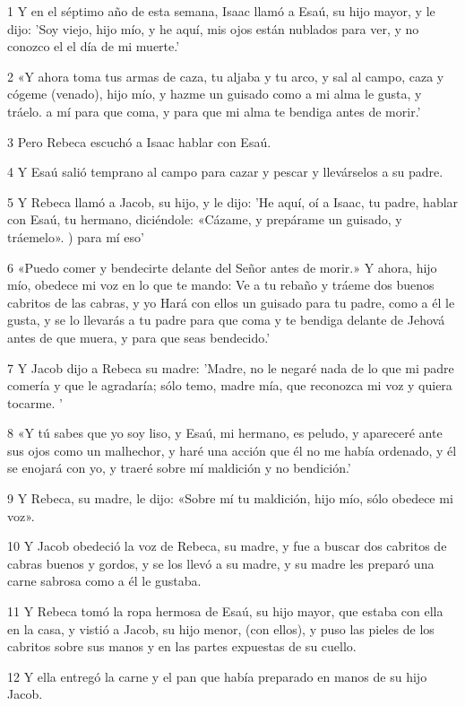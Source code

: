 \par 1 Y en el séptimo año de esta semana, Isaac llamó a Esaú, su hijo mayor, y le dijo: 'Soy viejo, hijo mío, y he aquí, mis ojos están nublados para ver, y no conozco el el día de mi muerte.'
\par 2 «Y ahora toma tus armas de caza, tu aljaba y tu arco, y sal al campo, caza y cógeme (venado), hijo mío, y hazme un guisado como a mi alma le gusta, y tráelo. a mí para que coma, y ​​para que mi alma te bendiga antes de morir.'
\par 3 Pero Rebeca escuchó a Isaac hablar con Esaú.
\par 4 Y Esaú salió temprano al campo para cazar y pescar y llevárselos a su padre.
\par 5 Y Rebeca llamó a Jacob, su hijo, y le dijo: 'He aquí, oí a Isaac, tu padre, hablar con Esaú, tu hermano, diciéndole: «Cázame, y prepárame un guisado, y tráemelo». ) para mí eso'
\par 6 «Puedo comer y bendecirte delante del Señor antes de morir.» Y ahora, hijo mío, obedece mi voz en lo que te mando: Ve a tu rebaño y tráeme dos buenos cabritos de las cabras, y yo Hará con ellos un guisado para tu padre, como a él le gusta, y se lo llevarás a tu padre para que coma y te bendiga delante de Jehová antes de que muera, y para que seas bendecido.'
\par 7 Y Jacob dijo a Rebeca su madre: 'Madre, no le negaré nada de lo que mi padre comería y que le agradaría; sólo temo, madre mía, que reconozca mi voz y quiera tocarme. '
\par 8 «Y tú sabes que yo soy liso, y Esaú, mi hermano, es peludo, y apareceré ante sus ojos como un malhechor, y haré una acción que él no me había ordenado, y él se enojará con yo, y traeré sobre mí maldición y no bendición.'
\par 9 Y Rebeca, su madre, le dijo: «Sobre mí tu maldición, hijo mío, sólo obedece mi voz».
\par 10 Y Jacob obedeció la voz de Rebeca, su madre, y fue a buscar dos cabritos de cabras buenos y gordos, y se los llevó a su madre, y su madre les preparó una carne sabrosa como a él le gustaba.
\par 11 Y Rebeca tomó la ropa hermosa de Esaú, su hijo mayor, que estaba con ella en la casa, y vistió a Jacob, su hijo menor, (con ellos), y puso las pieles de los cabritos sobre sus manos y en las partes expuestas de su cuello.
\par 12 Y ella entregó la carne y el pan que había preparado en manos de su hijo Jacob.

